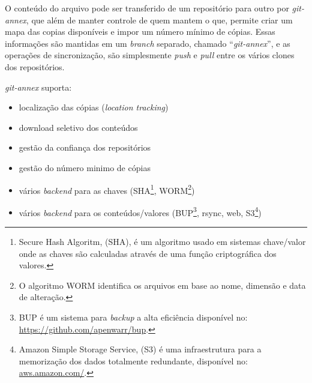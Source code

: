 O conteúdo do arquivo pode ser transferido de um repositório para
outro por \emph{git-annex}, que além de manter controle de quem mantem
o que, permite criar um mapa das copias disponíveis e impor um número
mínimo de cópias. Essas informações são mantidas em um \emph{branch}
separado, chamado ``\emph{git-annex}'', e as operações de
sincronização, são simplesmente \emph{push} e \emph{pull} entre os
vários clones dos repositórios.

\emph{git-annex} suporta:
\begin{itemize}
\item localização das cópias (\emph{location tracking})
\item download seletivo dos conteúdos 
\item gestão da confiança dos repositórios
\item gestão do número minimo de cópias
\item vários \emph{backend} para as chaves (SHA\footnote{Secure Hash
    Algoritm, (SHA), é um algoritmo usado em sistemas chave/valor onde
    as chaves são calculadas através de uma função criptográfica dos
    valores.}, WORM\footnote{O algoritmo WORM identifica os arquivos
    em base ao nome, dimensão e data de alteração.})
\item vários \emph{backend} para os conteúdos/valores
  (BUP\footnote{BUP é um sistema para \emph{backup} a alta eficiência
    disponível no: \url{https://github.com/apenwarr/bup}.}, rsync,
  web, S3\footnote{Amazon Simple Storage Service, (S3) é uma
    infraestrutura para a memorização dos dados totalmente redundante,
    disponível no: \url{aws.amazon.com/}.})
\end{itemize}


% 


% 


